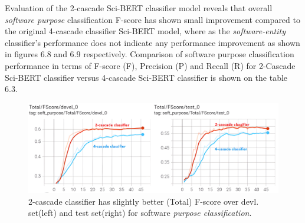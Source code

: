 Evaluation of the 2-cascade Sci-BERT classifier model reveals that overall \emph{software purpose} classification F-score has shown small improvement compared to the original 4-cascade classifier  \ac{Sci-BERT} model, where as the \emph{software-entity} classifier’s performance does not indicate any performance improvement as shown in figures 6.8 and 6.9 respectively. Comparison of software purpose classification performance in terms of F-score (F), Precision (P) and Recall (R) for 2-Cascade Sci-BERT classifier versus 4-cascade Sci-BERT classifier is shown on the table 6.3. \\

\begin{figure}[htbp]
	\centering
	\includegraphics[width=1\textwidth]{4.graphics/figures/ch_6/5.2layerClassifier/HD/4casadeVs2cascade}
	\caption{2-cascade classifier has slightly better (Total) F-score over devl. set(left) and test set(right) for software \emph{purpose classification}.}
	\label{fig:chapter06:with}
\end{figure}


